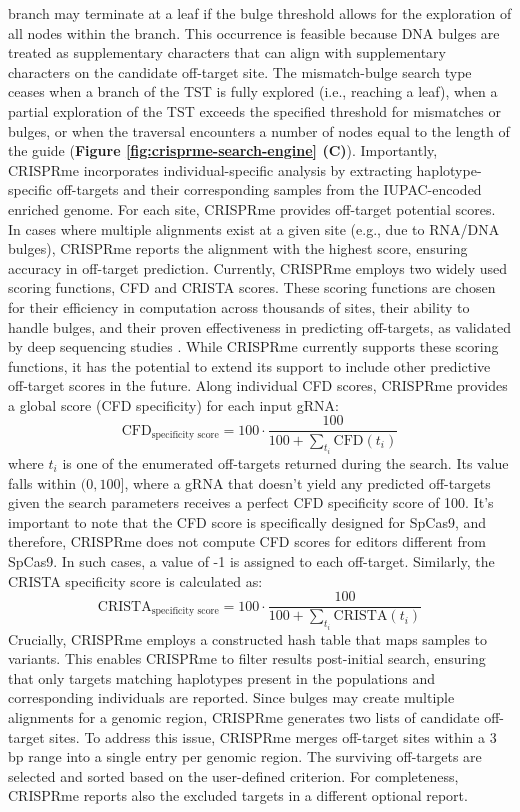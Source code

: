 \documentclass[a4paper, titlepage, openright]{book}
\newcommand{\crisprme}{CRISPRme\xspace}
\begin{document}
branch may terminate at a leaf if the bulge threshold allows for the exploration of all nodes within the branch. This occurrence is feasible because DNA bulges are treated as supplementary characters that can align with supplementary characters on the candidate off-target site. The mismatch-bulge search type ceases when a branch of the TST is fully explored (i.e., reaching a leaf), when a partial exploration of the TST exceeds the specified threshold for mismatches or bulges, or when the traversal encounters a number of nodes equal to the length of the guide (\textbf{Figure \ref{fig:crisprme-search-engine} (C)}). Importantly, \crisprme incorporates individual-specific analysis by extracting haplotype-specific off-targets and their corresponding samples from the IUPAC-encoded enriched genome. For each site, \crisprme provides off-target potential scores. In cases where multiple alignments exist at a given site (e.g., due to RNA/DNA bulges), \crisprme reports the alignment with the highest score, ensuring accuracy in off-target prediction. Currently, \crisprme employs two widely used scoring functions, CFD \citep{doench2016optimized} and CRISTA \citep{abadi2017machine} scores. These scoring functions are chosen for their efficiency in computation across thousands of sites, their ability to handle bulges, and their proven effectiveness in predicting off-targets, as validated by deep sequencing studies \citep{bao2021tools}. While \crisprme currently supports these scoring functions, it has the potential to extend its support to include other predictive off-target scores in the future. Along individual CFD scores, \crisprme provides a global score (CFD specificity) for each input gRNA:
\[
    \text{CFD}_{\text{specificity score}}=100 \cdot \frac{100}{100 + \sum_{t_{i}}{\text{CFD}(t_{i})}}
\]
where $t_{i}$ is one of the enumerated off-targets returned during the search. Its value falls within $(0, 100]$, where a gRNA that doesn't yield any predicted off-targets given the search parameters receives a perfect CFD specificity score of 100. It's important to note that the CFD score is specifically designed for SpCas9, and therefore, \crisprme does not compute CFD scores for editors different from SpCas9. In such cases, a value of -1 is assigned to each off-target. Similarly, the CRISTA specificity score is calculated as:
\[
    \text{CRISTA}_{\text{specificity score}} = 100 \cdot \frac{100}{100 + \sum_{t_{i}}{\text{CRISTA}(t_{i})}}
\]
Crucially, \crisprme employs a constructed hash table that maps samples to variants. This enables \crisprme to filter results post-initial search, ensuring that only targets matching haplotypes present in the populations and corresponding individuals are reported. Since bulges may create multiple alignments for a genomic region, \crisprme generates two lists of candidate off-target sites. To address this issue, \crisprme merges off-target sites within a 3 bp range into a single entry per genomic region. The surviving off-targets are selected and sorted based on the user-defined criterion. For completeness, \crisprme reports also the excluded targets in a different optional report.
\end{document}
